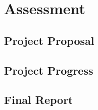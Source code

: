 \chapter{Assessment}\label{cha:assessment}


\section{Project Proposal}

\section{Project Progress}


\section{Final Report} 


